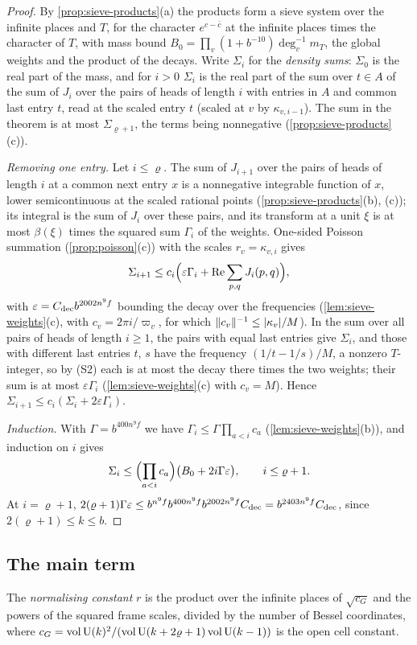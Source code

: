 \begin{proof}
By \cref{prop:sieve-products}(a) the products form a sieve system over the infinite places and $T$, for the character $e^{c-\bar c}$ at the infinite places times the character of $T$, with mass bound
$B_0=\prod_v(1+b^{-10})\deg_v^{-1}m_T$, the global weights and the product of the decays. Write $\Sigma_i$ for the \emph{density sums}: $\Sigma_0$ is the real part of the mass, and for $i>0$ $\Sigma_i$ is the real part of the
sum over $t\in A$ of the sum of $J_i$ over the pairs of heads of length $i$ with entries in $A$ and common last entry $t$, read at the scaled entry $t$ (scaled at $v$ by $\kappa_{v,i-1}$). The sum in the theorem is at most
$\Sigma_{\varrho+1}$, the terms being nonnegative (\cref{prop:sieve-products}(c)).

\emph{Removing one entry.} Let $i\le\varrho$. The sum of $J_{i+1}$ over the pairs of heads of length $i$ at a common next entry $x$ is a nonnegative integrable function of $x$, lower semicontinuous at the scaled
rational points (\cref{prop:sieve-products}(b), (c)); its integral is the sum of $J_i$ over these pairs, and its transform at a unit $\xi$ is at most $\beta(\xi)$ times the squared sum $\Gamma_i$ of the weights. One-sided Poisson summation
(\cref{prop:poisson}(c)) with the scales $r_v=\kappa_{v,i}$ gives
\[
  \Sigma_{i+1}\le c_i\Bigl(\varepsilon\Gamma_i+\operatorname{Re}\sum_{p,q}J_i(p,q)\Bigr),
\]
with $\varepsilon=C_{\rm dec}b^{2002n^9f}$ bounding the decay over the frequencies (\cref{lem:sieve-weights}(c), with $c_v=2\pi i/\varpi_v$, for which $\lVert c_v\rVert^{-1}\le\lvert \kappa_v\rvert/M$). In the sum over all pairs of heads of length $i\ge1$, the
pairs with equal last entries give $\Sigma_i$, and those with different last entries $t$, $s$ have the frequency $(1/t-1/s)/M$, a nonzero $T$-integer, so by (S2) each is at most the decay there times the two weights; their sum is
at most $\varepsilon\Gamma_i$ (\cref{lem:sieve-weights}(c) with $c_v=M$). Hence $\Sigma_{i+1}\le c_i(\Sigma_i+2\varepsilon\Gamma_i)$.

\emph{Induction.} With $\Gamma=b^{400n^9f}$ we have $\Gamma_i\le\Gamma\prod_{a<i}c_a$ (\cref{lem:sieve-weights}(b)), and induction on $i$ gives
\[
  \Sigma_i\le\Bigl(\prod_{a<i}c_a\Bigr)\bigl(B_0+2i\Gamma\varepsilon\bigr),\qquad i\le\varrho+1.
\]
At $i=\varrho+1$, $2(\varrho+1)\Gamma\varepsilon\le b^{n^9f}b^{400n^9f}b^{2002n^9f}C_{\rm dec}=b^{2403n^9f}C_{\rm dec}$, since $2(\varrho+1)\le k\le b$.
\end{proof}

\subsection{The main term}\label{ss:main-term-bound}
The \emph{normalising constant} $r$ is the product over the infinite places of $\sqrt{c_G}$ and the powers of the squared frame scales, divided by the number of Bessel coordinates, where
$c_G=\operatorname{vol}\operatorname{U}(k)^2/(\operatorname{vol}\operatorname{U}(k+2\varrho+1)\operatorname{vol}\operatorname{U}(k-1))$ is the open cell constant.

